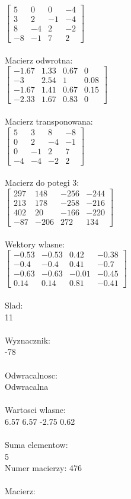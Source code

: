 \documentclass[a4paper,12pt]{article}
\begin{document}
$\begin{bmatrix} 5&0&0&-4\\3&2&-1&-4\\8&-4&2&-2\\-8&-1&7&2 \end{bmatrix}$
\\
\\
Macierz odwrotna:\\

$\begin{bmatrix} -1.67&1.33&0.67&0\\-3&2.54&1&0.08\\-1.67&1.41&0.67&0.15\\-2.33&1.67&0.83&0 \end{bmatrix}$
\\
\\
Macierz transponowana:\\

$\begin{bmatrix} 5&3&8&-8\\0&2&-4&-1\\0&-1&2&7\\-4&-4&-2&2 \end{bmatrix}$
\\
\\
Macierz do potegi 3:\\

$\begin{bmatrix} 297&148&-256&-244\\213&178&-258&-216\\402&20&-166&-220\\-87&-206&272&134 \end{bmatrix}$
\\
\\
Wektory wlasne:\\

$\begin{bmatrix} -0.53&-0.53&0.42&-0.38\\-0.4&-0.4&0.41&-0.7\\-0.63&-0.63&-0.01&-0.45\\0.14&0.14&0.81&-0.41 \end{bmatrix}$
\\
\\
Slad:\\
11
\\
\\
Wyznacznik:\\
-78
\\
\\
Odwracalnosc:\\
Odwracalna
\\
\\
Wartosci wlasne:\\
6.57 6.57 -2.75 0.62
\\
\\
Suma elementow:\\
5
\\
\newpage
Numer macierzy:
476
\\
\\
Macierz:\\
\end{document}
